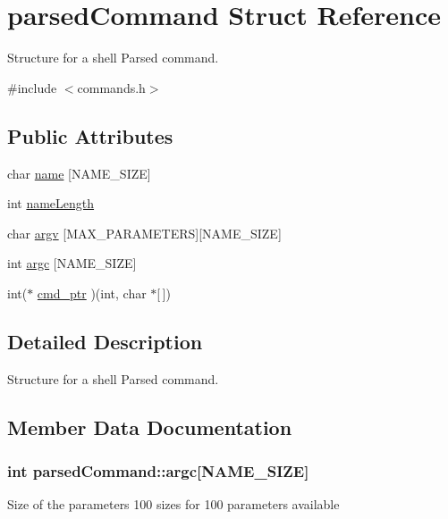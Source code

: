 \hypertarget{structparsedCommand}{}\section{parsed\+Command Struct Reference}
\label{structparsedCommand}


Structure for a shell Parsed command.  




{\ttfamily \#include $<$commands.\+h$>$}

\subsection*{Public Attributes}
\begin{DoxyCompactItemize}
\item 
char \hyperlink{structparsedCommand_aec09a148c5dd11208e7b10d55a8f7d10}{name} \mbox{[}N\+A\+M\+E\+\_\+\+S\+I\+ZE\mbox{]}
\item 
int \hyperlink{structparsedCommand_aa033e89de347318fe68eec79f7474a15}{name\+Length}
\item 
char \hyperlink{structparsedCommand_a41f05153a28973b8327b5dd8d2c5b064}{argv} \mbox{[}M\+A\+X\+\_\+\+P\+A\+R\+A\+M\+E\+T\+E\+RS\mbox{]}\mbox{[}N\+A\+M\+E\+\_\+\+S\+I\+ZE\mbox{]}
\item 
int \hyperlink{structparsedCommand_a902d3d429ecebdde55a054563ada702f}{argc} \mbox{[}N\+A\+M\+E\+\_\+\+S\+I\+ZE\mbox{]}
\item 
int($\ast$ \hyperlink{structparsedCommand_a51be8726adae8deeb2ea625a11504234}{cmd\+\_\+ptr} )(int, char $\ast$\mbox{[}$\,$\mbox{]})
\end{DoxyCompactItemize}


\subsection{Detailed Description}
Structure for a shell Parsed command. 

\subsection{Member Data Documentation}
\subsubsection[{\texorpdfstring{argc}{argc}}]{\setlength{\rightskip}{0pt plus 5cm}int parsed\+Command\+::argc\mbox{[}N\+A\+M\+E\+\_\+\+S\+I\+ZE\mbox{]}}\hypertarget{structparsedCommand_a902d3d429ecebdde55a054563ada702f}{}\label{structparsedCommand_a902d3d429ecebdde55a054563ada702f}
Size of the parameters 100 sizes for 100 parameters available 
